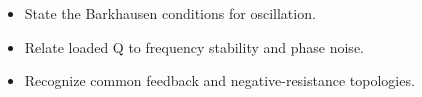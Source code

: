 \begin{objectives}
\begin{itemize}[leftmargin=1.4em,itemsep=2pt]
\item State the Barkhausen conditions for oscillation.
\item Relate loaded Q to frequency stability and phase noise.
\item Recognize common feedback and negative-resistance topologies.
\end{itemize}
\end{objectives}
